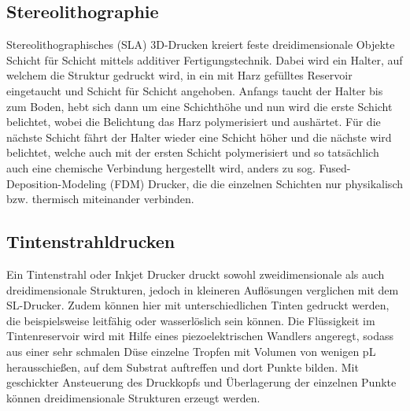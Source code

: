 \subsection{Stereolithographie}

Stereolithographisches (SLA) 3D-Drucken kreiert feste dreidimensionale Objekte Schicht für Schicht mittels additiver Fertigungstechnik. Dabei wird ein Halter, auf welchem die Struktur gedruckt wird, in ein mit Harz gefülltes Reservoir eingetaucht und Schicht für Schicht angehoben. Anfangs taucht der Halter bis zum Boden, hebt sich dann um eine Schichthöhe und nun wird die erste Schicht belichtet, wobei die Belichtung das Harz polymerisiert und aushärtet. Für die nächste Schicht fährt der Halter wieder eine Schicht höher und die nächste wird belichtet, welche auch mit der ersten Schicht polymerisiert und so tatsächlich auch eine chemische Verbindung hergestellt wird, anders zu sog. Fused-Deposition-Modeling (FDM) Drucker, die die einzelnen Schichten nur physikalisch bzw. thermisch miteinander verbinden.

\subsection{Tintenstrahldrucken}

Ein Tintenstrahl oder Inkjet Drucker druckt sowohl zweidimensionale als auch dreidimensionale Strukturen, jedoch in kleineren Auflösungen verglichen mit dem SL-Drucker. Zudem können hier mit unterschiedlichen Tinten gedruckt werden, die beispielsweise leitfähig oder wasserlöslich sein können. Die Flüssigkeit im Tintenreservoir wird mit Hilfe eines piezoelektrischen Wandlers angeregt, sodass aus einer sehr schmalen Düse einzelne Tropfen mit Volumen von wenigen \si{\pico\liter} herausschießen, auf dem Substrat auftreffen und dort Punkte bilden. Mit geschickter Ansteuerung des Druckkopfs und Überlagerung der einzelnen Punkte können dreidimensionale Strukturen erzeugt werden.
